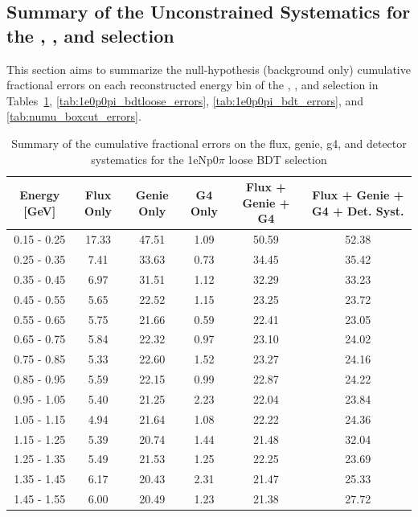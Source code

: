 \subsection{Summary of the Unconstrained Systematics for the \npsel, \zpsel, and \numu selection}
\label{subsec:syst:syst_table}

This section aims to summarize the null-hypothesis (background only) cumulative fractional errors on each reconstructed energy bin of the \npsel, \zpsel, and \numu selection in Tables~\ref{tab:1eNp0pi_bdt_errors}, \ref{tab:1e0p0pi_bdtloose_errors}, \ref{tab:1e0p0pi_bdt_errors}, and \ref{tab:numu_boxcut_errors}. 

\begin{table}[H]
\centering
\begin{tabular}{| c | c | c | c | c | c |}
\hline
Energy [GeV] & Flux Only & Genie Only  & G4 Only & Flux + Genie + G4 & Flux + Genie + G4 + Det. Syst. \\
\hline
0.15 - 0.25 & 17.33 & 47.51 & 1.09 & 50.59 & 52.38 \\
0.25 - 0.35 & 7.41 & 33.63 & 0.73 & 34.45 & 35.42 \\
0.35 - 0.45 & 6.97 & 31.51 & 1.12 & 32.29 & 33.23 \\
0.45 - 0.55 & 5.65 & 22.52 & 1.15 & 23.25 & 23.72 \\
0.55 - 0.65 & 5.75 & 21.66 & 0.59 & 22.41 & 23.05 \\
0.65 - 0.75 & 5.84 & 22.32 & 0.97 & 23.10 & 24.02 \\
0.75 - 0.85 & 5.33 & 22.60 & 1.52 & 23.27 & 24.16 \\
0.85 - 0.95 & 5.59 & 22.15 & 0.99 & 22.87 & 24.22 \\
0.95 - 1.05 & 5.40 & 21.25 & 2.23 & 22.04 & 23.84 \\
1.05 - 1.15 & 4.94 & 21.64 & 1.08 & 22.22 & 24.36 \\
1.15 - 1.25 & 5.39 & 20.74 & 1.44 & 21.48 & 32.04 \\
1.25 - 1.35 & 5.49 & 21.53 & 1.25 & 22.25 & 23.69 \\
1.35 - 1.45 & 6.17 & 20.43 & 2.31 & 21.47 & 25.33 \\
1.45 - 1.55 & 6.00 & 20.49 & 1.23 & 21.38 & 27.72 \\
\hline
\end{tabular}
\caption{Summary of the cumulative fractional errors on the flux, genie, g4, and detector systematics for the 1eNp0$\pi$ loose BDT selection}
\label{tab:1eNp0pi_bdt_errors}
\end{table}


